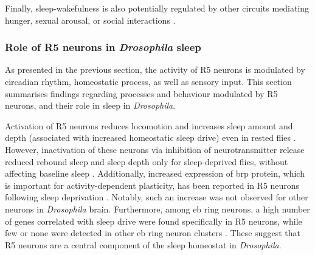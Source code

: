 \documentclass[../main.tex]{subfiles}
\begin{document}
Finally, sleep-wakefulness is also potentially regulated by other circuits mediating hunger, sexual arousal, or
social interactions \cite{suarez-grimaltNeuralArchitectureSleep2021,shaferRegulationDrosophilaSleep2021}.


\subsubsection{Role of R5 neurons in \textit{Drosophila} sleep} \label{subsubsec:role_of_r5_neurons}

As presented in the previous section, the activity of R5 neurons is modulated by circadian rhythm, homeostatic process, as well as sensory input. This section summarises findings regarding processes and behaviour modulated by R5 neurons, and their role in sleep in \textit{Drosophila}.

Activation of R5 neurons reduces locomotion and increases sleep amount and depth (associated with increased homeostatic sleep drive) even in rested flies \cite{raccugliaCoherentMultilevelNetwork2022,liuSleepDriveEncoded2016}.
However, inactivation of these neurons via inhibition of neurotransmitter release reduced rebound sleep and sleep depth only for sleep-deprived flies, without affecting baseline sleep \cite{liuSleepDriveEncoded2016}.
Additionally, increased expression of \gls{brp} protein, which is important for activity-dependent plasticity, has been reported in R5 neurons following sleep deprivation \cite{liuSleepDriveEncoded2016}.
Notably, such an increase was not observed for other neurons in \textit{Drosophila} brain. Furthermore, among \gls{eb} ring neurons, a high number of genes correlated with sleep drive were found specifically in R5 neurons, while few or none were detected in other \gls{eb} ring neuron clusters \cite{doppSinglecellTranscriptomicsReveals2024}. These suggest that R5 neurons are a central component of the sleep homeostat in \textit{Drosophila}.
\end{document}
